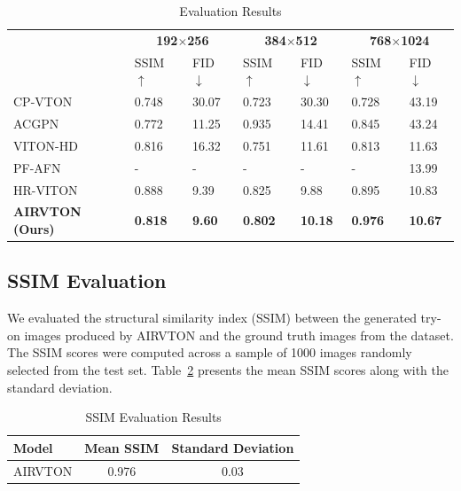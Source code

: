 \begin{table}[htbp]
    \caption{Evaluation Results}
    \label{tab:evaluation_results}
    \centering
    \begin{tabular}[htbp]{|l|l|l|l|l|l|l|}
    \hline
        ~ &  \multicolumn{2}{c|}{\textbf{192$\times$256}} &  \multicolumn{2}{c|}{\textbf{384$\times$512}} & \multicolumn{2}{c|}{\textbf{768$\times$1024}} \\ 
        ~ &  SSIM ${\uparrow}$ &  FID ${\downarrow}$ &  SSIM ${\uparrow}$  &  FID ${\downarrow}$ &  SSIM ${\uparrow}$ &  FID ${\downarrow}$ \\ \hline
        CP-VTON &  0.748  &  30.07  &  0.723  &  30.30  &  0.728  &  43.19  \\ 
        ACGPN &  0.772  &  11.25  &  0.935  &  14.41  &  0.845  &  43.24  \\ 
        VITON-HD &  0.816  &  16.32  &  0.751  &  11.61  &  0.813  &  11.63  \\ 
        PF-AFN &  -    &  -    &  -    &  -    &  -    &  13.99  \\ 
        HR-VITON &  0.888  &  9.39  &  0.825  &  9.88  &  0.895  &  10.83  \\ 
        \textbf{AIRVTON (Ours)} &  \textbf{0.818}  &  \textbf{9.60}  &  \textbf{0.802}  &  \textbf{10.18}  &  \textbf{0.976}  &  \textbf{10.67}  \\ \hline
    \end{tabular}
\end{table}

\subsection{SSIM Evaluation}

We evaluated the structural similarity index (SSIM) between the generated try-on images produced by AIRVTON and the ground truth images from the dataset. The SSIM scores were computed across a sample of 1000 images randomly selected from the test set. Table~\ref{tab:ssim_results} presents the mean SSIM scores along with the standard deviation.


\begin{table}[htbp]
  \caption{SSIM Evaluation Results}
  \label{tab:ssim_results}
  \centering
  \begin{tabular}{lcc}
    \toprule
    \textbf{Model} & \textbf{Mean SSIM} & \textbf{Standard Deviation} \\
    \midrule
    AIRVTON & 0.976 & 0.03 \\
    \bottomrule
  \end{tabular}
\end{table}

